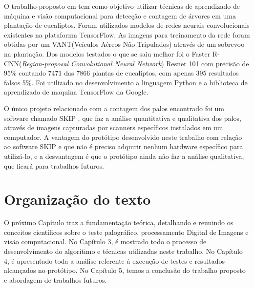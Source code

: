 O trabalho proposto em \cite{SILVA2018} tem como objetivo utilizar técnicas de aprendizado de máquina e visão computacional para detecção e contagem de árvores em uma plantação de eucaliptos. Foram utilizados modelos de redes neurais convolucionais existentes na plataforma TensorFlow. As imagens para treinamento da rede foram obtidas por um VANT(Veículos Aéreos Não Tripulados) através de um sobrevoo na plantação. Dos modelos testados o que se saiu melhor foi o Faster R-CNN(\textit{Region-proposal Convolutional Neural Network}) Resnet 101 com precisão de 95\% contando 7471 das 7866 plantas de eucaliptos, com apenas 395 resultados falsos 5\%.  Foi utilizado no desenvolvimento a linguagem Python e a biblioteca de aprendizado de maquina TensorFlow da Google.

O único projeto relacionado com a contagem dos palos encontrado foi um software chamado SKIP \cite{skip-artigo}, que faz a análise quantitativa e qualitativa dos palos, através de imagens capturadas por scanners específicos instalados em um computador. A vantagem do protótipo desenvolvido neste trabalho com relação ao software SKIP e que não é preciso adquirir nenhum hardware específico para utilizá-lo, e a desvantagem é que o protótipo ainda não faz a análise qualitativa, que ficará para trabalhos futuros.




\section{Organização do texto}
\label{sec:motiv}

O próximo Capítulo traz a fundamentação teórica, detalhando e reunindo os conceitos científicos sobre o teste palográfico, processamento Digital de Imagens e visão computacional. No Capítulo 3, é mostrado todo o processo de desenvolvimento do algorítimo e técnicas utilizadas neste trabalho. No Capítulo 4, é apresentado toda a análise referente à execução de testes e resultados alcançados no protótipo. No Capítulo 5, temos a conclusão do trabalho proposto e abordagem de trabalhos futuros.
